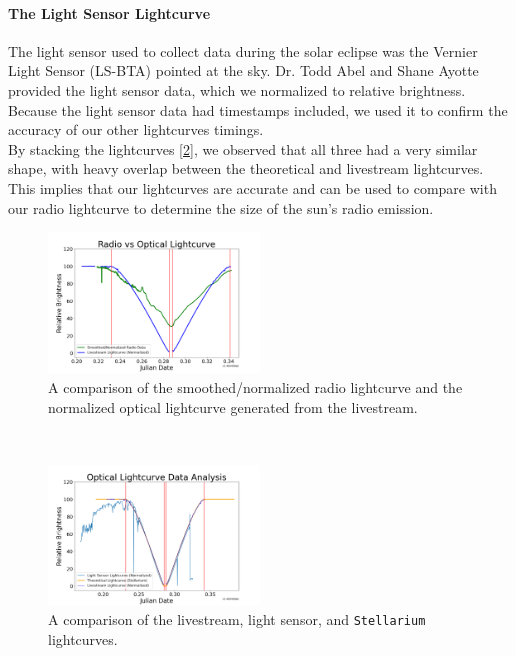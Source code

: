 \paragraph{The Light Sensor Lightcurve}
The light sensor used to collect data during the solar eclipse was the Vernier Light Sensor (LS-BTA) pointed at the sky.
Dr. Todd Abel and Shane Ayotte provided the light sensor data, which we normalized to relative brightness.
Because the light sensor data had timestamps included, we used it to confirm the accuracy of our other lightcurves timings.
\\
By stacking the lightcurves [\ref{fig:OpticalLightcurveComparison}], we observed that all three had a very similar shape, with heavy overlap between the theoretical and livestream lightcurves.
This implies that our lightcurves are accurate and can be used to compare with our radio lightcurve to determine the size of the sun’s radio emission.
\\
\begin{figure}
    \includegraphics[width=0.5\textwidth]{figures/radioOpticalComparison}
    \caption{\label{fig:radioOpticalComparison} A comparison of the smoothed/normalized radio lightcurve and the normalized optical lightcurve generated from the livestream.}
\end{figure}
\\
\begin{figure}
    \includegraphics[width=0.5\textwidth]{figures/OpticalLightcurveComparison}
    \caption{\label{fig:OpticalLightcurveComparison} A comparison of the livestream, light sensor, and \texttt{Stellarium} lightcurves.}
\end{figure}